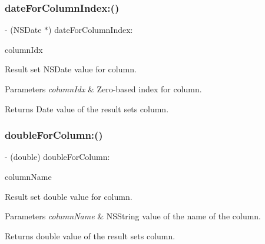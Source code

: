 \subsubsection{\texorpdfstring{date\+For\+Column\+Index\+:()}{dateForColumnIndex:()}}
{\footnotesize\ttfamily -\/ (N\+S\+Date $\ast$) date\+For\+Column\+Index\+: \begin{DoxyParamCaption}\item[{(int)}]{column\+Idx }\end{DoxyParamCaption}}

Result set {\ttfamily N\+S\+Date} value for column.


\begin{DoxyParams}{Parameters}
{\em column\+Idx} & Zero-\/based index for column.\\
\hline
\end{DoxyParams}
\begin{DoxyReturn}{Returns}
Date value of the result set\textquotesingle{}s column. 
\end{DoxyReturn}
\mbox{\label{interface_o_p_t_l_y_f_m_d_b_result_set_a65460490ebc13600470cab4ae42f4bb4}} 
\subsubsection{\texorpdfstring{double\+For\+Column\+:()}{doubleForColumn:()}}
{\footnotesize\ttfamily -\/ (double) double\+For\+Column\+: \begin{DoxyParamCaption}\item[{(N\+S\+String$\ast$)}]{column\+Name }\end{DoxyParamCaption}}

Result set {\ttfamily double} value for column.


\begin{DoxyParams}{Parameters}
{\em column\+Name} & {\ttfamily N\+S\+String} value of the name of the column.\\
\hline
\end{DoxyParams}
\begin{DoxyReturn}{Returns}
{\ttfamily double} value of the result set\textquotesingle{}s column. 
\end{DoxyReturn}
\mbox{\label{interface_o_p_t_l_y_f_m_d_b_result_set_add5fea1d6cda3b32f38de2fb4b0d7817}} 
